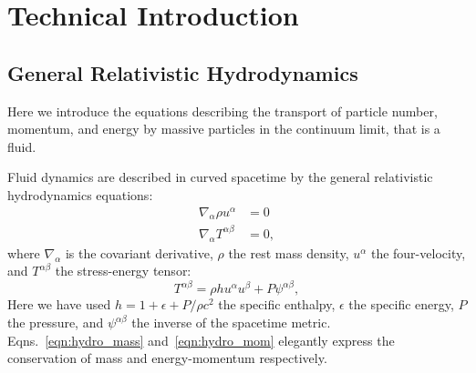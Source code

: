 \chapter{Technical Introduction}
\label{chap:intro}



\section{General Relativistic Hydrodynamics}
\label{sec:gr_hydro}
Here we introduce the equations describing the transport of particle number,
momentum, and energy by massive particles in the continuum limit, that is
a fluid.

Fluid dynamics are described in curved spacetime by the general relativistic
hydrodynamics equations:
\begin{align}
  \label{eqn:hydro_mass}
  \nabla_\alpha \rho u^\alpha &= 0 \\
  \label{eqn:hydro_mom}
  \nabla_\alpha T^{\alpha\beta} &= 0,
\end{align}
where $\nabla_\alpha$ is the covariant derivative,
$\rho$ the rest mass density,
$u^\alpha$ the four-velocity,
and $T^{\alpha\beta}$ the stress-energy tensor:
\begin{equation}
  \label{eqn:stress_energy}
  T^{\alpha\beta} = \rho h u^\alpha u^\beta + P \psi^{\alpha\beta},
\end{equation}
Here we have used $h=1+\epsilon+P/\rho c^2$ the specific enthalpy,
$\epsilon$ the specific energy,
$P$ the pressure, and
$\psi^{\alpha\beta}$ the inverse of the spacetime metric.
Eqns.~\ref{eqn:hydro_mass} and~\ref{eqn:hydro_mom} elegantly express the
conservation of mass and energy-momentum respectively.

